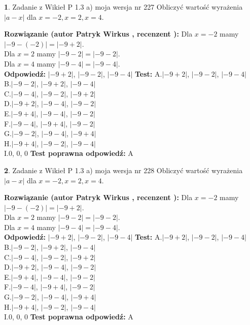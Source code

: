 \documentclass[12pt, a4paper]{article}
\theoremstyle{definition} %
\newtheorem{zad}{}
\newcommand{\zadStart}[1]{\begin{zad}#1\newline}
\newcommand{\zadStop}{\end{zad}}
\newcommand{\rozwStart}[2]{\noindent \textbf{Rozwiązanie (autor #1 , recenzent #2): }\newline}
\newcommand{\rozwStop}{\newline}
\newcommand{\odpStart}{\noindent \textbf{Odpowiedź:}\newline}
\newcommand{\odpStop}{\newline}
\newcommand{\testStart}{\noindent \textbf{Test:}\newline}
\newcommand{\testStop}{\newline}
\newcommand{\kluczStart}{\noindent \textbf{Test poprawna odpowiedź:}\newline}
\newcommand{\kluczStop}{\newline}
\begin{document}
\zadStart{Zadanie z Wikieł P 1.3 a) moja wersja nr 227}
Obliczyć wartość wyrażenia $|a - x|$ dla $x=-2,x=2,x=4$.
\zadStop
\rozwStart{Patryk Wirkus}{}
Dla $x = -2$ mamy $|-9 - (-2)| = |-9 + 2|$.\\
Dla $x = 2$ mamy $|-9 - 2| = |-9 - 2|$.\\
Dla $x = 4$ mamy $|-9 - 4| = |-9 - 4|$.\\
\rozwStop
\odpStart
$|-9 + 2|$, $|-9 - 2|$, $|-9 - 4|$
\odpStop
\testStart
A.$|-9 + 2|$, $|-9 - 2|$, $|-9 - 4|$\\
B.$|-9 - 2|$, $|-9 + 2|$, $|-9 - 4|$\\
C.$|-9 - 4|$, $|-9 - 2|$, $|-9 + 2|$\\
D.$|-9 + 2|$, $|-9 - 4|$, $|-9 - 2|$\\
E.$|-9 + 4|$, $|-9 - 4|$, $|-9 - 2|$\\
F.$|-9 - 4|$, $|-9 + 4|$, $|-9 - 2|$\\
G.$|-9 - 2|$, $|-9 - 4|$, $|-9 + 4|$\\
H.$|-9 + 4|$, $|-9 - 2|$, $|-9 - 4|$\\
I.$0$, $0$, $0$
\testStop
\kluczStart
A
\kluczStop



\zadStart{Zadanie z Wikieł P 1.3 a) moja wersja nr 228}
Obliczyć wartość wyrażenia $|a - x|$ dla $x=-2,x=2,x=4$.
\zadStop
\rozwStart{Patryk Wirkus}{}
Dla $x = -2$ mamy $|-9 - (-2)| = |-9 + 2|$.\\
Dla $x = 2$ mamy $|-9 - 2| = |-9 - 2|$.\\
Dla $x = 4$ mamy $|-9 - 4| = |-9 - 4|$.\\
\rozwStop
\odpStart
$|-9 + 2|$, $|-9 - 2|$, $|-9 - 4|$
\odpStop
\testStart
A.$|-9 + 2|$, $|-9 - 2|$, $|-9 - 4|$\\
B.$|-9 - 2|$, $|-9 + 2|$, $|-9 - 4|$\\
C.$|-9 - 4|$, $|-9 - 2|$, $|-9 + 2|$\\
D.$|-9 + 2|$, $|-9 - 4|$, $|-9 - 2|$\\
E.$|-9 + 4|$, $|-9 - 4|$, $|-9 - 2|$\\
F.$|-9 - 4|$, $|-9 + 4|$, $|-9 - 2|$\\
G.$|-9 - 2|$, $|-9 - 4|$, $|-9 + 4|$\\
H.$|-9 + 4|$, $|-9 - 2|$, $|-9 - 4|$\\
I.$0$, $0$, $0$
\testStop
\kluczStart
A
\kluczStop
\end{document}
